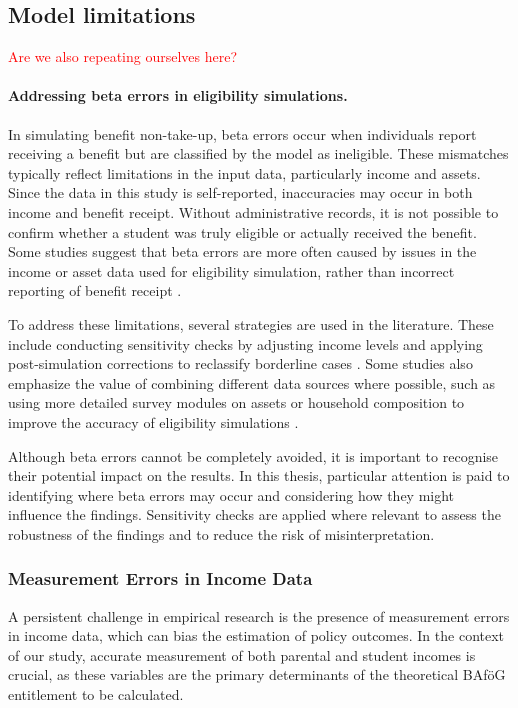 \subsection{Model limitations}
\label{subsection:model_limitations}

\textcolor{red}{Are we also repeating ourselves here?}

\paragraph{Addressing beta errors in eligibility simulations.}
In simulating benefit non-take-up, beta errors occur when individuals report receiving a benefit but are classified by the model as ineligible. 
These mismatches typically reflect limitations in the input data, particularly income and assets.
Since the data in this study is self-reported, inaccuracies may occur in both income and benefit receipt.
Without administrative records, it is not possible to confirm whether a student was truly eligible or actually received the benefit. 
Some studies suggest that beta errors are more often caused by issues in the income or asset data used for eligibility simulation, rather than incorrect reporting of benefit receipt \citep{frick_claim_2007, janssens_takemod_2022}. 

To address these limitations, several strategies are used in the literature. 
These include conducting sensitivity checks by adjusting income levels and applying post-simulation corrections to reclassify borderline cases \citep{herber_non-take-up_2019}. 
Some studies also emphasize the value of combining different data sources where possible, such as using more detailed survey modules on assets or household composition to improve the accuracy of eligibility simulations \citep{janssens_takemod_2022}. 

Although beta errors cannot be completely avoided, it is important to recognise their potential impact on the results. 
In this thesis, particular attention is paid to identifying where beta errors may occur and considering how they might influence the findings. 
Sensitivity checks are applied where relevant to assess the robustness of the findings and to reduce the risk of misinterpretation. %

\subsubsection{Measurement Errors in Income Data}
A persistent challenge in empirical research is the presence of measurement errors in income data, which can bias the estimation of policy outcomes. 
In the context of our study, accurate measurement of both parental and student incomes is crucial, as these variables are the primary determinants of the theoretical BAföG entitlement to be calculated.

